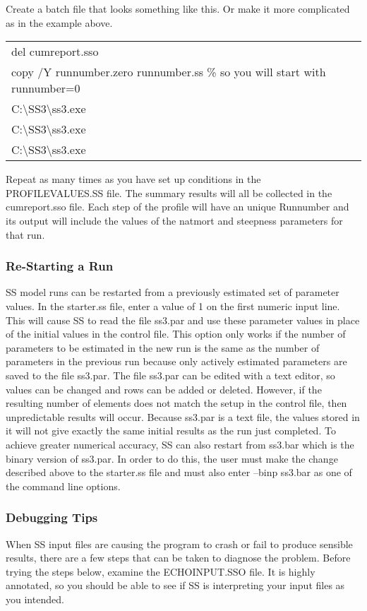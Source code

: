 Create a batch file that looks something like this.  Or make it more complicated as in the example above.

\begin{center}
	\begin{longtable}{p{15cm}}		
		del cumreport.sso\\
		copy /Y runnumber.zero runnumber.ss  \% so you will start with runnumber=0 \\
		C:\textbackslash SS3\textbackslash ss3.exe \\
		C:\textbackslash SS3\textbackslash ss3.exe \\
		C:\textbackslash SS3\textbackslash ss3.exe \\
	\end{longtable}
\end{center}

Repeat as many times as you have set up conditions in the PROFILEVALUES.SS file.
The summary results will all be collected in the cumreport.sso file.  Each step of the profile will have an unique Runnumber and its output will include the values of the natmort and steepness parameters for that run.

\subsubsection{Re-Starting a Run}
SS model runs can be restarted from a previously estimated set of parameter values.  In the starter.ss file, enter a value of 1 on the first numeric input line.  This will cause SS to read the file ss3.par and use these parameter values in place of the initial values in the control file.  This option only works if the number of parameters to be estimated in the new run is the same as the number of parameters in the previous run because only actively estimated parameters are saved to the file ss3.par.  The file ss3.par can be edited with a text editor, so values can be changed and rows can be added or deleted.  However, if the resulting number of elements does not match the setup in the control file, then unpredictable results will occur.  Because ss3.par is a text file, the values stored in it will not give exactly the same initial results as the run just completed.  To achieve greater numerical accuracy, SS can also restart from ss3.bar which is the binary version of ss3.par.  In order to do this, the user must make the change described above to the starter.ss file and must also enter –binp ss3.bar as one of the command line options.

\subsubsection{Debugging Tips}
When SS input files are causing the program to crash or fail to produce sensible results, there are a few steps that can be taken to diagnose the problem.  Before trying the steps below, examine the ECHOINPUT.SSO file.  It is highly annotated, so you should be able to see if SS is interpreting your input files as you intended.

